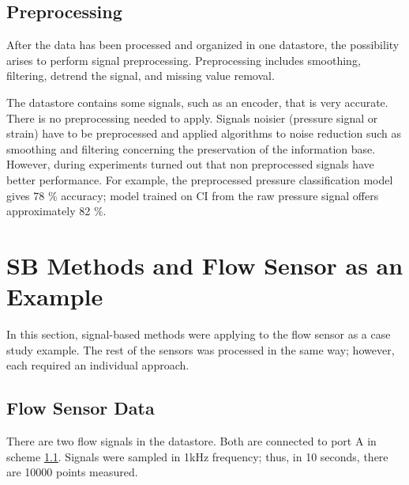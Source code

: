 
\subsection{Preprocessing}

After the data has been processed and organized in one datastore, the
possibility arises to perform signal preprocessing.  Preprocessing includes
smoothing, filtering, detrend the signal, and missing value removal.

The datastore contains some signals, such as an encoder, that is very
accurate. There is no preprocessing needed to apply. Signals noisier
(pressure signal or strain) have to be preprocessed and applied algorithms
to noise reduction such as smoothing and filtering concerning the
preservation of the information base. However, during experiments turned
out that non preprocessed signals have better performance. For example, the
preprocessed pressure classification model gives 78 \% accuracy; model
trained on CI from the raw pressure signal offers approximately 82 \%.

\section{SB Methods and Flow Sensor as an Example}\label{sec:flow_example}
In this section, signal-based methods were applying to the flow sensor as a
case study example.  The rest of the sensors was processed in the same way;
however, each required an individual approach.

\subsection{Flow Sensor Data}
There are two flow signals in the datastore. Both are connected to port A
in scheme \ref{}. Signals were sampled in 1kHz frequency; thus, in 10
seconds, there are 10000 points measured. 

